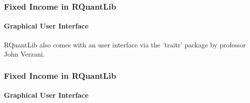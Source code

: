 \documentclass[smaller,compress, 9pt]{beamer}
\begin{document}
\begin{frame}
	\frametitle{Fixed Income in RQuantLib}
	\framesubtitle{Graphical User Interface}		
RQuantLib also comes with an user interface via the 'traitr' package by professor John Verzani.
\begin{center}
\end{center}
\end{frame}

\begin{frame}
	\frametitle{Fixed Income in RQuantLib}
	\framesubtitle{Graphical User Interface}	
\begin{center}
\end{center}
\end{frame}
\end{document}
